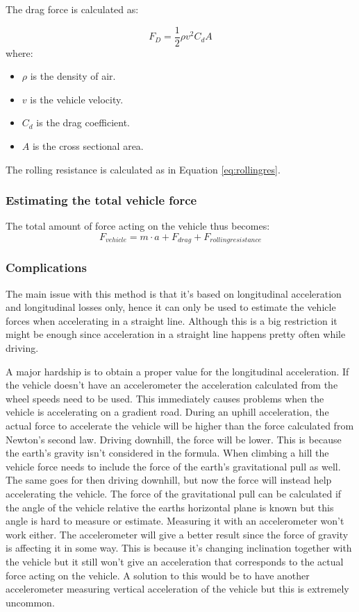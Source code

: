 The drag force is calculated as:

\begin{equation}
F_{D}=\frac{1}{2}\rho v^2 C_{d}A
\end{equation}
where:
\begin{itemize}
	\item $ \rho $ is the density of air.
	\item $ v $ is the vehicle velocity.
	\item $ C_{d} $ is the drag coefficient.
	\item $ A $ is the cross sectional area.
\end{itemize}
The rolling resistance is calculated as in Equation \ref{eq:rollingres}.

\subsubsection{Estimating the total vehicle force}
The total amount of force acting on the vehicle thus becomes:
\begin{equation}
\label{eq:newton}
F_{vehicle} = m \cdot a + F_{drag} + F_{rolling resistance}
\end{equation}

\subsubsection{Complications}
The main issue with this method is that it's based on longitudinal acceleration and longitudinal losses only, hence it can only be used to estimate the vehicle forces when accelerating in a straight line. Although this is a big restriction it might be enough since acceleration in a straight line happens pretty often while driving.

A major hardship is to obtain a proper value for the longitudinal acceleration. If the vehicle doesn't have an accelerometer the acceleration calculated from the wheel speeds need to be used. This immediately causes problems when the vehicle is accelerating on a gradient road. During an uphill acceleration, the actual force to accelerate the vehicle will be higher than the force calculated from Newton's second law. Driving downhill, the force will be lower. This is because the earth's gravity isn't considered in the formula. When climbing a hill the vehicle force needs to include the force of the earth's gravitational pull as well. The same goes for then driving downhill, but now the force will instead help accelerating the vehicle. The force of the gravitational pull can be calculated if the angle of the vehicle relative the earths horizontal plane is known but this angle is hard to measure or estimate. Measuring it with an accelerometer won't work either. The accelerometer will give a better result since the force of gravity is affecting it in some way. This is because it's changing inclination together with the vehicle but it still won't give an acceleration that corresponds to the actual force acting on the vehicle. A solution to this would be to have another accelerometer measuring vertical acceleration of the vehicle but this is extremely uncommon.

